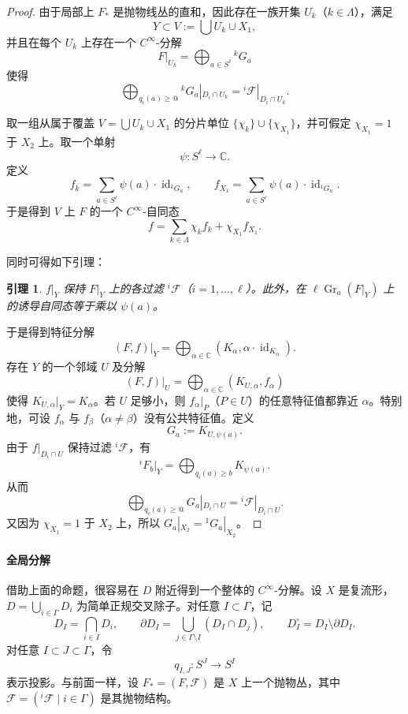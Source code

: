 \documentclass[12pt,a4paper]{article}
\newtheorem{lemma}[theorem]{引理}
\newcommand{\Gr}{\operatorname{Gr}}
\newcommand{\Id}{\operatorname{id}}
\begin{document}
\begin{proof}
由于局部上 \(F_*\) 是抛物线丛的直和，因此存在一族开集 \(U_k\)（\(k\in\Lambda\)），满足
\[
Y\subset V:=\bigcup U_k\cup X_1,
\]
并且在每个 \(U_k\) 上存在一个 \(C^\infty\)-分解
\[
F|_{U_k}=\bigoplus_{a\in S^\ell} {}^kG_a
\]
使得
\[
\bigoplus_{q_i(a)\ge @} {}^kG_a|_{D_i\cap U_k}
=
{}^i\mathcal F|_{D_i\cap U_k}.
\]

取一组从属于覆盖 \(V=\bigcup U_k\cup X_1\) 的分片单位 \(\{\chi_k\}\cup \{\chi_{X_1}\}\)，并可假定 \(\chi_{X_1}=1\) 于 \(X_2\) 上。取一个单射
\[
\psi:S^\ell\to \mathbb C.
\]
定义
\[
f_k=\sum_{a\in S^\ell}\psi(a)\cdot \Id_{{}^kG_a},
\qquad
f_{X_1}=\sum_{a\in S^\ell}\psi(a)\cdot \Id_{{}^1G_a}.
\]
于是得到 \(V\) 上 \(F\) 的一个 \(C^\infty\)-自同态
\[
f=\sum_{k\in\Lambda}\chi_k f_k+\chi_{X_1}f_{X_1}.
\]

同时可得如下引理：

\begin{lemma}
\(f|_Y\) 保持 \(F|_Y\) 上的各过滤 \({}^i\mathcal F\)（\(i=1,\dots,\ell\)）。此外，在 \(\ell\Gr_a(F|_Y)\) 上的诱导自同态等于乘以 \(\psi(a)\)。
\end{lemma}

于是得到特征分解
\[
(F,f)|_Y=\bigoplus_{\alpha\in\mathbb C}(K_\alpha,\alpha\cdot \Id_{K_\alpha}).
\]
存在 \(Y\) 的一个邻域 \(U\) 及分解
\[
(F,f)|_U=\bigoplus_{\alpha\in\mathbb C}(K_{U,\alpha},f_\alpha)
\]
使得 \(K_{U,\alpha}|_Y=K_\alpha\)。若 \(U\) 足够小，则 \(f_\alpha|_P\)（\(P\in U\)）的任意特征值都靠近 \(\alpha\)。特别地，可设 \(f_\alpha\) 与 \(f_\beta\)（\(\alpha\ne\beta\)）没有公共特征值。定义
\[
G_a:=K_{U,\psi(a)}.
\]
由于 \(f|_{D_i\cap U}\) 保持过滤 \({}^i\mathcal F\)，有
\[
{}^iF_b|_Y=\bigoplus_{q_i(a)\ge b}K_{\psi(a)}.
\]
从而
\[
\bigoplus_{q_i(a)\ge @}G_a|_{D_i\cap U}
=
{}^i\mathcal F|_{D_i\cap U}.
\]
又因为 \(\chi_{X_1}=1\) 于 \(X_2\) 上，所以 \(G_a|_{X_2}={}^1G_a|_{X_2}\)。
\end{proof}

\paragraph{全局分解}
借助上面的命题，很容易在 \(D\) 附近得到一个整体的 \(C^\infty\)-分解。设 \(X\) 是复流形，\(D=\bigcup_{i\in\Gamma}D_i\) 为简单正规交叉除子。对任意 \(I\subset \Gamma\)，记
\[
D_I=\bigcap_{i\in I}D_i,\qquad
\partial D_I=\bigcup_{j\in \Gamma\setminus I}(D_I\cap D_j),\qquad
D_I^\circ=D_I\setminus \partial D_I.
\]
对任意 \(I\subset J\subset \Gamma\)，令
\[
q_{I,J}:S^J\to S^I
\]
表示投影。与前面一样，设 \(F_*=(F,\mathcal F)\) 是 \(X\) 上一个抛物丛，其中 \(\mathcal F=({}^i\mathcal F\mid i\in\Gamma)\) 是其抛物结构。
\end{document}
